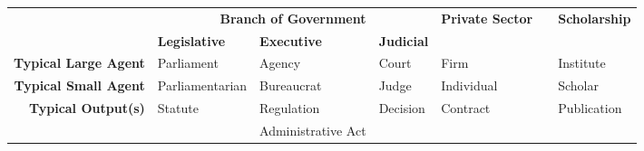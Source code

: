 \renewcommand{\arraystretch}{1.5}
\small
    \begin{tabular}{rllllll}
		\toprule&\multicolumn{3}{c}{\bfseries Branch of Government}&\bfseries Private Sector&&\bfseries Scholarship\\
		&\bfseries Legislative & \bfseries Executive & \bfseries Judicial&&&\\\midrule
		\bfseries Typical Large Agent&Parliament&Agency&Court&Firm&&Institute\\
		\bfseries Typical Small Agent&Parliamentarian&Bureaucrat&Judge&Individual&&Scholar\\
		\bfseries Typical Output(s)&Statute&Regulation&Decision&Contract&&Publication\\[-6pt]
		&&Administrative Act&&\\
		\bottomrule
	\end{tabular}

